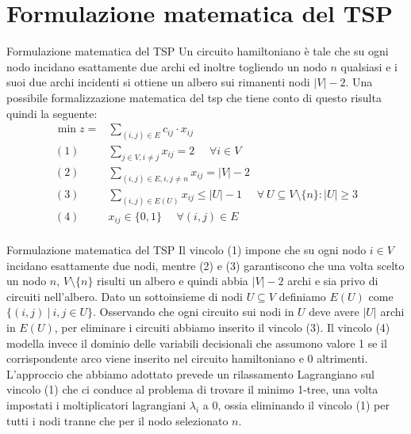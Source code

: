 \documentclass[10pt]{beamer}
\begin{document}
\section{Formulazione matematica del TSP}
\begin{frame}{Formulazione matematica del TSP}
    Un circuito hamiltoniano è tale che su ogni nodo incidano esattamente due archi ed inoltre togliendo un nodo $n$ qualsiasi e i suoi due archi incidenti si ottiene un albero sui rimanenti nodi $|V| - 2$. Una possibile formalizzazione matematica del tsp che tiene conto di questo risulta quindi la seguente:
    \begin{equation*}
      \begin{split}
        \min z = & \sum_{(i,j) \in E} c_{ij} \cdot x_{ij}\\
        (1)\:\:\:\:\:\: & \sum_{j \in V, i \neq j} x_{ij} = 2 \:\:\:\:\:\: \forall i \in V \\
        (2) \:\:\:\:\:\: & \sum_{(i,j)\in E, i, j \neq n} x_{ij} = |V|-2 \\
        (3) \:\:\:\:\:\: & \sum_{(i,j) \in E(U)} x_{ij} \leq |U| - 1 \:\:\:\:\:\: \forall\: U \subseteq V\setminus\{n\} : |U| \geq 3 \\
        (4) \:\:\:\:\:\: & x_{ij} \in \{0,1\} \:\:\:\:\:\: \forall (i,j) \in E\\
      \end{split}
    \end{equation*}
\end{frame}

\begin{frame}{Formulazione matematica del TSP}
    Il vincolo (1) impone che su ogni nodo $i \in V$ incidano esattamente due nodi, mentre (2) e (3) garantiscono che una volta scelto un nodo $n$, $V \setminus \{n\}$ risulti un albero e quindi abbia $|V|-2$ archi e sia privo di circuiti nell'albero. 
    Dato un sottoinsieme di nodi $U \subseteq V$ definiamo $E(U)$ come $\{ (i,j) \:|\: i,j \in U \}$. Osservando che ogni circuito sui nodi in $U$ deve avere $|U|$ archi in $E(U)$, per eliminare i circuiti abbiamo inserito il vincolo (3). Il vincolo (4) modella invece il dominio delle variabili decisionali che assumono valore 1 se il corrispondente arco viene inserito nel circuito hamiltoniano e 0 altrimenti.
    \newline
    \newline
    L'approccio che abbiamo adottato prevede un rilassamento Lagrangiano sul vincolo (1) che ci conduce al problema di trovare il minimo 1-tree, una volta impostati i moltiplicatori lagrangiani $\lambda_i$ a 0, ossia eliminando il vincolo (1) per tutti i nodi tranne che per il nodo selezionato $n$.
\end{frame}
\end{document}
